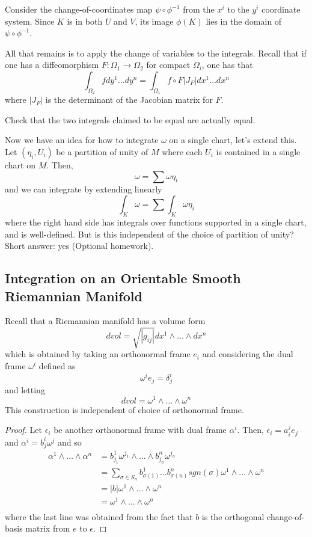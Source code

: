 \documentclass[../main.tex]{subfiles}
\begin{document}
Consider the change-of-coordinates map $\psi\circ\phi^{-1}$ from the $x^i$ to
the $y^i$ coordinate system. Since $K$ is in both $U$ and $V$, its image
$\phi(K)$ lies in the domain of $\psi\circ\phi^{-1}$.

All that remains is to apply the change of variables to the integrals. Recall
that if one has a diffeomorphism $F:\Omega_1\to\Omega_2$ for compact $\Omega_i$,
one has that
\[
    \int_{\Omega_2}fdy^1\ldots dy^n = \int_{\Omega_1}f\circ F|J_F|dx^1\ldots
    dx^n
\]
where $|J_F|$ is the determinant of the Jacobian matrix for $F$.
\begin{hw}
    Check that the two integrals claimed to be equal are actually equal.
\end{hw}

Now we have an idea for how to integrate $\omega$ on a single chart, let's
extend this. Let $(\eta_i,U_i)$ be a partition of unity of $M$ where each $U_i$
is contained in a single chart on $M$. Then,
\[
    \omega = \sum\omega\eta_i
\]
and we can integrate by extending linearly
\[
    \int_K\omega = \sum\int_{K}\omega\eta_i
\]
where the right hand side has integrals over functions supported in a single
chart, and is well-defined. But is this independent of the choice of partition
of unity? Short answer: yes (Optional homework).

\subsection{Integration on an Orientable Smooth Riemannian Manifold}
Recall that a Riemannian manifold has a volume form
\[
    dvol = \sqrt{|g_{ij}|}dx^1\wedge\ldots\wedge dx^n
\]
which is obtained by taking an orthonormal frame $e_i$ and considering the dual
frame $\omega^i$ defined as
\[
    \omega^ie_j = \delta^i_j
\]
and letting
\[
    dvol = \omega^1\wedge\ldots\wedge\omega^n
\]
This construction is independent of choice of orthonormal frame.
\begin{proof}
Let $\epsilon_i$ be another orthonormal frame with dual frame $\alpha^i$. Then,
$\epsilon_i = a^j_ie_j$ and $\alpha^i = b^i_j\omega^j$ and so
    \[
        \begin{aligned}
            \alpha^1\wedge\ldots\wedge\alpha^n &=
            b^1_{j_1}\omega^{j_1}\wedge\ldots\wedge b^n_{j_n}\omega^{j_n}\\
            &= \sum_{\sigma\in S_n} b^1_{\sigma(1)}\ldots
            b^n_{\sigma(n)}sgn(\sigma)\omega^1\wedge\ldots\wedge\omega^n\\
            &= |b|\omega^1\wedge\ldots\wedge\omega^n\\
            &= \omega^1\wedge\ldots\wedge\omega^n\\
        \end{aligned}
    \]
    where the last line was obtained from the fact that $b$ is the orthogonal
    change-of-basis matrix from $e$ to $\epsilon$.
\end{proof}
\end{document}
